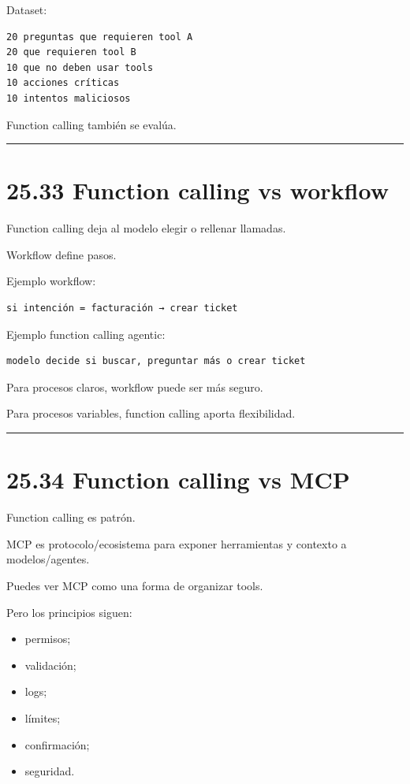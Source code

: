 Dataset:

\begin{lstlisting}
20 preguntas que requieren tool A
20 que requieren tool B
10 que no deben usar tools
10 acciones críticas
10 intentos maliciosos
\end{lstlisting}

Function calling también se evalúa.

\begin{center}\rule{0.5\linewidth}{0.5pt}\end{center}

\section{25.33 Function calling vs
workflow}\label{function-calling-vs-workflow}

Function calling deja al modelo elegir o rellenar llamadas.

Workflow define pasos.

Ejemplo workflow:

\begin{lstlisting}
si intención = facturación → crear ticket
\end{lstlisting}

Ejemplo function calling agentic:

\begin{lstlisting}
modelo decide si buscar, preguntar más o crear ticket
\end{lstlisting}

Para procesos claros, workflow puede ser más seguro.

Para procesos variables, function calling aporta flexibilidad.

\begin{center}\rule{0.5\linewidth}{0.5pt}\end{center}

\section{25.34 Function calling vs MCP}\label{function-calling-vs-mcp}

Function calling es patrón.

MCP es protocolo/ecosistema para exponer herramientas y contexto a
modelos/agentes.

Puedes ver MCP como una forma de organizar tools.

Pero los principios siguen:

\begin{itemize}
\tightlist
\item
  permisos;
\item
  validación;
\item
  logs;
\item
  límites;
\item
  confirmación;
\item
  seguridad.
\end{itemize}

